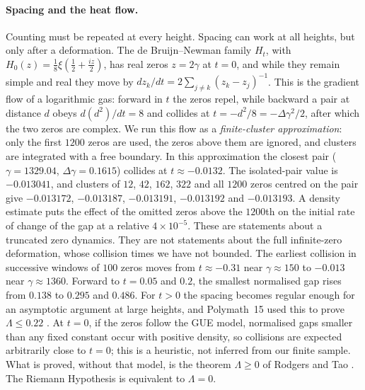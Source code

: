 \documentclass[11pt,a4paper]{article}
\theoremstyle{definition}\newtheorem{definition}[proposition]{Definition}
\theoremstyle{remark}\newtheorem{remark}[proposition]{Remark}
\begin{document}
\paragraph{Spacing and the heat flow.} Counting must be repeated at every height. Spacing can work at all heights, but only after a deformation. The de Bruijn--Newman family $H_t$, with $H_0(z)=\frac18\xi(\frac12+\frac{iz}2)$, has real zeros $z=2\gamma$ at $t=0$, and while they remain simple and real they move by $dz_k/dt=2\sum_{j\ne k}(z_k-z_j)^{-1}$. This is the gradient flow of a logarithmic gas: forward in $t$ the zeros repel, while backward a pair at distance $d$ obeys $d(d^2)/dt=8$ and collides at $t=-d^2/8=-\Delta\gamma^2/2$, after which the two zeros are complex. We run this flow as a \emph{finite-cluster approximation}: only the first $1200$ zeros are used, the zeros above them are ignored, and clusters are integrated with a free boundary. In this approximation the closest pair ($\gamma=1329.04$, $\Delta\gamma=0.1615$) collides at $t\approx-0.0132$. The isolated-pair value is $-0.013041$, and clusters of $12$, $42$, $162$, $322$ and all $1200$ zeros centred on the pair give $-0.013172$, $-0.013187$, $-0.013191$, $-0.013192$ and $-0.013193$. A density estimate puts the effect of the omitted zeros above the $1200$th on the initial rate of change of the gap at a relative $4\times10^{-5}$. These are statements about a truncated zero dynamics. They are not statements about the full infinite-zero deformation, whose collision times we have not bounded. The earliest collision in successive windows of $100$ zeros moves from $t\approx-0.31$ near $\gamma\approx150$ to $-0.013$ near $\gamma\approx1360$. Forward to $t=0.05$ and $0.2$, the smallest normalised gap rises from $0.138$ to $0.295$ and $0.486$. For $t>0$ the spacing becomes regular enough for an asymptotic argument at large heights, and Polymath~15 used this to prove $\Lambda\le0.22$ \cite{Polymath2019}. At $t=0$, if the zeros follow the GUE model, normalised gaps smaller than any fixed constant occur with positive density, so collisions are expected arbitrarily close to $t=0$; this is a heuristic, not inferred from our finite sample. What is proved, without that model, is the theorem $\Lambda\ge0$ of Rodgers and Tao \cite{RodgersTao2020}. The Riemann Hypothesis is equivalent to $\Lambda=0$.
\end{document}
